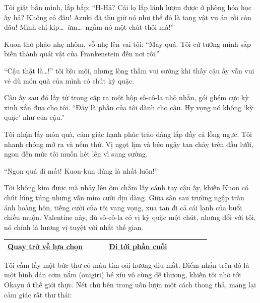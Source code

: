 \documentclass[../main.tex]{subfiles}
\begin{document}
Tôi giật bắn mình, lắp bắp: ``H-Hả? Cái lọ lấp lánh lượm được ở phòng hóa học ấy hả? Không có đâu! Azuki đã thu giữ nó như thể đó là tang vật vụ án rồi còn đâu! Mình chỉ kịp\dots\ ừm\dots\ ngắm nó một chút thôi mà!''

Kuon thở phào nhẹ nhõm, vỗ nhẹ lên vai tôi: ``May quá. Tôi cứ tưởng mình sắp biến thành quái vật của Frankenstein đến nơi rồi.''

``Cậu thật là\dots!'' tôi bĩu môi, nhưng lòng thầm vui sướng khi thấy cậu ấy vẫn vui vẻ dù món quà của mình có chút kỳ quặc.

Cậu ấy sau đó lấy từ trong cặp ra một hộp sô-cô-la nhỏ nhắn, gói ghém cực kỳ xinh xắn đưa cho tôi. ``Đây là phần của tôi dành cho cậu. Hy vọng nó không `kỳ quặc' như của cậu.''

Tôi nhận lấy món quà, cảm giác hạnh phúc trào dâng lấp đầy cả lồng ngực. Tôi nhanh chóng mở ra và nếm thử. Vị ngọt lịm và béo ngậy tan chảy trên đầu lưỡi, ngon đến mức tôi muốn hét lên vì sung sướng.

``Ngon quá đi mất! Kuon-kun đúng là nhất luôn!''

Tôi không kìm được mà nhảy lên ôm chầm lấy cánh tay cậu ấy, khiến Kuon có chút lúng túng nhưng vẫn mỉm cười dịu dàng. Giữa sân sau trường ngập tràn ánh hoàng hôn, tiếng cười của tôi vang vọng, xua tan đi cả cái lạnh của buổi chiều muộn. Valentine này, dù sô-cô-la có vị kỳ quặc một chút, nhưng đối với tôi, nó chính là hương vị tuyệt vời nhất thế gian.

\begin{table}[H]
  \centering
  \setlength{\arrayrulewidth}{1pt}
  \begin{tabular}{|>{\centering\arraybackslash}p{0.4\linewidth}|>{\centering\arraybackslash}p{0.4\linewidth}|}
    \hline
    \hyperref[choice]{Quay trở về lựa chọn} & \hyperref[ending]{Đi tới phần cuối} \\ \hline
  \end{tabular}
\end{table}

\newpage
\label{yuka}

Tôi cầm lấy một bức thư có màu tím oải hương dịu mắt. Điểm nhấn trên đó là một hình dán cơm nắm (onigiri) bé xíu vô cùng dễ thương, khiến tôi nhớ tới Okayu ở thế giới thực. Nét chữ bên trong uốn lượn một cách thong thả, mang lại cảm giác rất thư thái:

\end{document}
